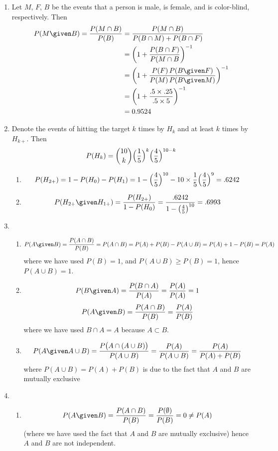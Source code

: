 \documentclass[12pt]{article}
\begin{document}
\begin{enumerate}
\item
Let
$M$, $F$, $B$ be the events that a person
is male, is female, and is color-blind, respectively.
Then
\[\begin{split}
P(M \given B)
= \frac{P(M \cap B)}{P(B)}
&= \frac{P(M \cap B)}{P(B\cap M) + P(B\cap F)}
\\
&= \biggl(1 + \frac{P(B\cap F)}{P(M\cap B}\biggr)^{-1}
\\
&= \biggl(1 + \frac{P(F)\,P(B\given F)}{P(M)\,P(B\given M)}\biggr)^{-1}
\\
&= \biggl(1 + \frac{.5\times .25}{.5\times 5}\biggr)^{-1}
\\
&= 0.9524
\end{split}
\]

\item
Denote the events of
hitting the target $k$ times by
$H_k$ and at least $k$ times by
$H_{k+}$. Then
\[
P(H_k) = {10\choose k}\Bigl(\frac{1}{5}\Bigr)^k
    \Bigl(\frac{4}{5}\Bigr)^{10-k}
\]

\begin{enumerate}
\item
\[
P(H_{2+})
= 1 - P(H_0) - P(H_1)
= 1 - \Bigl(\frac{4}{5}\Bigr)^{10}
    - 10\times\frac{1}{5} \Bigl(\frac{4}{5}\Bigr)^9
= .6242
\]

\item
\[
P(H_{2+}\given H_{1+})
= \frac{P(H_{2+})}{1 - P(H_0)}
= \frac{.6242}{1 - \bigl(\frac{4}{5}\bigr)^{10}}
= .6993
\]
\end{enumerate}

\item
\begin{enumerate}
\item
\[
P(A\given B)
= \frac{P(A\cap B)}{P(B)}
= P(A\cap B)
= P(A) + P(B) - P(A\cup B)
= P(A) + 1 - P(B)
= P(A)
\]
where we have used
$P(B) = 1$,
and $P(A\cup B) \ge P(B) = 1$,
hence $P(A\cup B) = 1$.

\item
\[
P(B\given A)
= \frac{P(B\cap A)}{P(A)}
= \frac{P(A)}{P(A)}
= 1
\]
\[
P(A\given B)
= \frac{P(A\cap B)}{P(B)}
= \frac{P(A)}{P(B)}
\]
where we have used $B\cap A = A$ because $A\subset B$.

\item
\[
P(A\given A\cup B)
= \frac{P\big(A\cap (A\cup B)\bigr)}{P(A\cup B)}
= \frac{P(A)}{P(A\cup B)}
= \frac{P(A)}{P(A) + P(B)}
\]
where
$P(A\cup B) = P(A) + P(B)$ is due to the fact
that $A$ and $B$ are mutually exclusive
\end{enumerate}

\item
\begin{enumerate}
\item
\[
P(A\given B)
= \frac{P(A\cap B)}{P(B)}
= \frac{P(\emptyset)}{P(B)}
= 0
\ne P(A)
\]
(where we have used the fact that
$A$ and $B$ are mutually exclusive)
hence
$A$ and $B$ are not independent.


\end{enumerate}
\end{enumerate}
\end{document}
